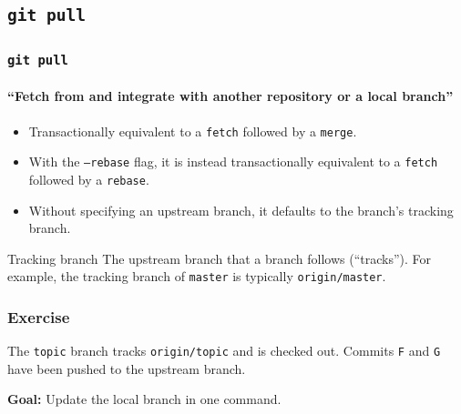 \documentclass{beamer}
\newcommand\gitcmd[1]{\texttt{git #1}}
\newcommand\gitsubcmd[1]{\texttt{#1}}
\newcommand\gflag[1]{\texttt{#1}}
\newcommand\grefspec[1]{\texttt{#1}}
\newcommand\gbranch[1]{\texttt{#1}}
\newcommand\gremotebranch[1]{\texttt{#1}}
\newcommand\goal[1]{\textbf{Goal:} #1}
\begin{document}
\subsection{\gitcmd{pull}}

\begin{frame}
  \frametitle{\gitcmd{pull}}
  \framesubtitle{``Fetch from and integrate with another repository or a local branch''}
  \begin{itemize}
    \item Transactionally equivalent to a \gitsubcmd{fetch} followed by a \gitsubcmd{merge}.
    \item With the \gflag{--rebase} flag, it is instead transactionally equivalent to a \gitsubcmd{fetch} followed by a \gitsubcmd{rebase}.
    \item Without specifying an upstream branch, it defaults to the branch's tracking branch.
  \end{itemize}
  \vfill
  \begin{block}{Tracking branch}
    The upstream branch that a branch follows (``tracks''). For example, the tracking branch of \gbranch{master} is typically \gremotebranch{origin/master}.
  \end{block}
\end{frame}

\begin{frame}
  \frametitle{Exercise}
  The \gbranch{topic} branch tracks \gremotebranch{origin/topic} and is checked out. Commits \grefspec{F} and \grefspec{G} have been pushed to the upstream branch.

  \goal{Update the local branch in one command.}

  \begin{figure}
    \centering
  \end{figure}
\end{frame}
\end{document}
